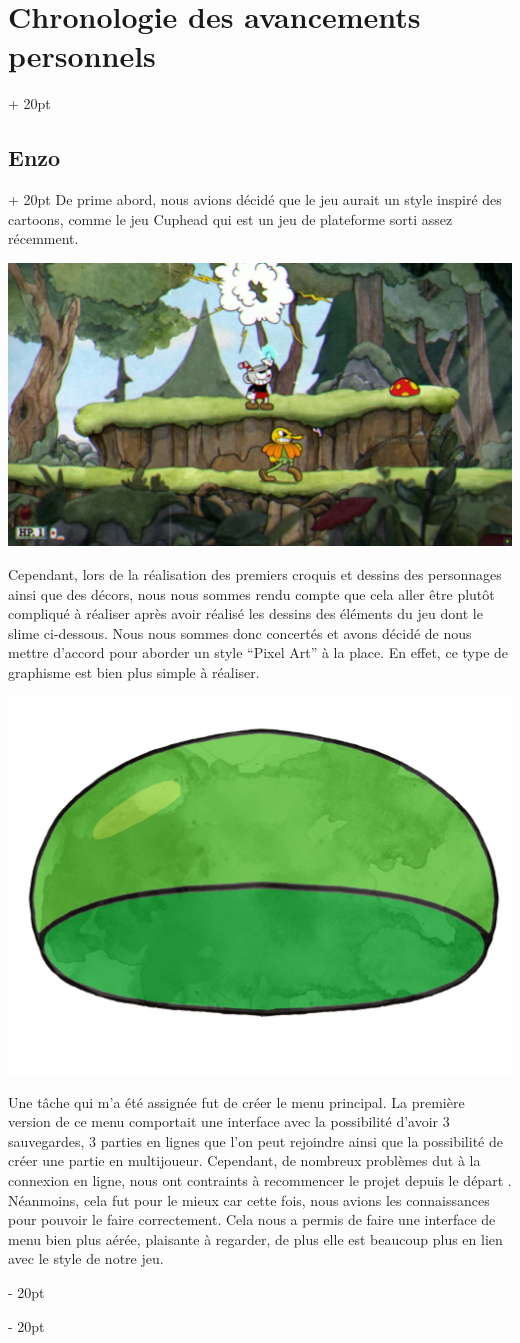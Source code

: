 \documentclass[a4paper, 12pt, twoside]{article}
\newcommand{\ind}[1][20pt]{\advance\leftskip + #1}
\newcommand{\deind}[1][20pt]{\advance\leftskip - #1}
\newenvironment{indt}[2][20pt]{#2 \par \ind[#1]}{\par \deind} %
\begin{document}
\begin{indt}{\section{Chronologie des avancements personnels}}
\begin{indt}{\subsection{Enzo}}
            De prime abord, nous avions décidé que le jeu aurait un style inspiré des cartoons, comme le jeu Cuphead qui est un jeu de plateforme sorti assez récemment.
            
            \begin{center}
                \includegraphics[width=0.8\linewidth]{Cuphead.png}
            \end{center}

            Cependant, lors de la réalisation des premiers croquis et dessins des personnages ainsi que des décors, nous nous sommes rendu compte que cela aller être plutôt compliqué à réaliser après avoir réalisé les dessins des éléments du jeu dont le slime ci-dessous. Nous nous sommes donc concertés et avons décidé de nous mettre d'accord pour aborder un style “Pixel Art” à la place. En effet, ce type de graphisme est bien plus simple à réaliser.

            \begin{center}
                \includegraphics[width=0.2\linewidth]{Slime.jpg}
            \end{center}

            Une tâche qui m'a été assignée fut de créer le menu principal. La première version de ce menu comportait une interface avec la possibilité d'avoir 3 sauvegardes, 3 parties en lignes que l'on peut rejoindre ainsi que la possibilité de créer une partie en multijoueur. Cependant, de nombreux problèmes dut à la connexion en ligne, nous ont contraints à recommencer le projet depuis le départ . Néanmoins, cela fut pour le mieux car cette fois, nous avions les connaissances pour pouvoir le faire correctement. Cela nous a permis de faire une interface de menu bien plus aérée, plaisante à regarder, de plus elle est beaucoup plus en lien avec le style de notre jeu.


\end{indt}
\end{indt}
\end{document}
